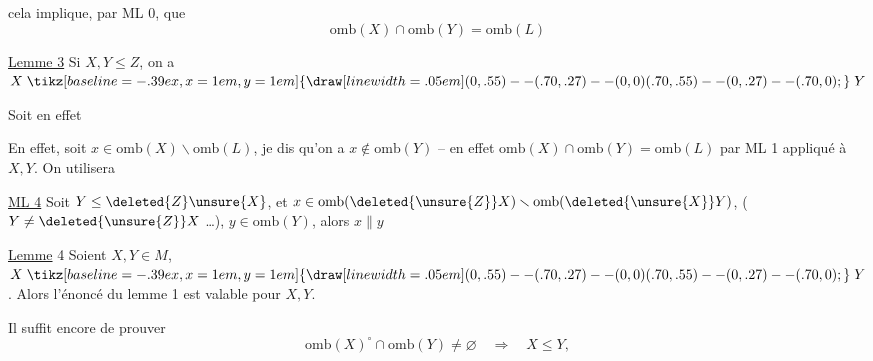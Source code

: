 
 cela implique, par ML 0, que 
\[
\mathrm{omb}(X)\cap\mathrm{omb}(Y)=\mathrm{omb}(L)
\]

\uline{Lemme 3} Si $X,Y\leq Z$, on a $X \mathrel{\tikz[baseline=-.39ex,x=1em,y=1em]{\draw[line width=.05em] (0,.55)--(.70,.27)--(0,0) (.70,.55)--(0,.27)--(.70,0);}} Y$

Soit en effet 


En effet, soit $x\in\mathrm{omb}(X)\smallsetminus\mathrm{omb}(L)$, je dis qu'on a $x\notin\mathrm{omb}(Y)$ -- en effet $\mathrm{omb}(X)\cap\mathrm{omb}(Y)=\mathrm{omb}(L)$ par ML 1 appliqué à $X,Y$. On utilisera 

\uline{ML 4} Soit $Y\leq\deleted{Z}\unsure{X}$,  et $x\in\mathrm{omb}(\deleted{\unsure{Z}}X)\smallsetminus\mathrm{omb}(\deleted{\unsure{X}}Y)$, ( $Y\neq\deleted{\unsure{Z}}X$ \ldots), $y\in\mathrm{omb}(Y)$, alors $x\parallel y$

\uline{Lemme} 4 Soient $X,Y\in M$, $X \mathrel{\tikz[baseline=-.39ex,x=1em,y=1em]{\draw[line width=.05em] (0,.55)--(.70,.27)--(0,0) (.70,.55)--(0,.27)--(.70,0);}} Y$. Alors l'énoncé du lemme 1 est valable pour $X,Y$.

Il suffit encore de prouver
\[
\mathrm{omb}(X)^\circ\cap\mathrm{omb}(Y)\neq\varnothing\quad\Longrightarrow\quad X\leq Y,
\]

